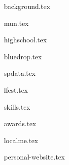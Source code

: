 \documentclass[11pt]{article}
\begin{document}
{background.tex}


{mun.tex}

{highschool.tex}


{bluedrop.tex}

{spdata.tex}

{lfest.tex}


{skills.tex}


{awards.tex}


{localme.tex}

{personal-website.tex}
\end{document}
